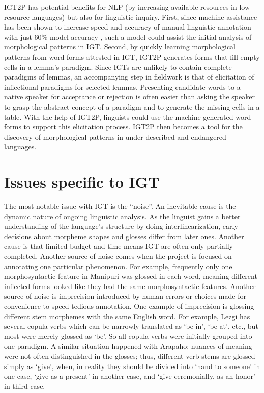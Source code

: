 IGT2P has potential benefits for NLP (by increasing available resources in low-resource languages) but also for linguistic inquiry. First, since machine-assistance has been shown to increase speed and accuracy of manual linguistic annotation with just 60\% model accuracy \citep{felt_improving_2012}, such a model could assist the initial analysis of morphological patterns in IGT. Second, by quickly learning morphological patterns from word forms attested in IGT, IGT2P generates forms that fill empty cells in a lemma's paradigm. Since IGTs are unlikely to contain complete paradigms of lemmas, an accompanying step in fieldwork is that of elicitation of inflectional paradigms for selected lemmas. Presenting candidate words to a native speaker for acceptance or rejection is often easier than asking the speaker to grasp the abstract concept of a paradigm and to generate the missing cells in a table. With the help of IGT2P, linguists could use the machine-generated word forms to support this elicitation process. IGT2P then becomes a tool for the discovery of morphological patterns in under-described and endangered languages.



\section{Issues specific to IGT}
\label{sec:issues}

The most notable issue with IGT is the ``noise''. An inevitable cause is the dynamic nature of ongoing linguistic analysis. As the linguist gains a better understanding of the language's structure by doing interlinearization, early decisions about morpheme shapes and glosses differ from later ones. Another cause is that limited budget and time means IGT are often only partially completed. Another source of noise comes when the project is focused on annotating one particular phenomenon. For example, frequently only one morphosyntactic feature in Manipuri was glossed in each word, meaning different inflected forms looked like they had the same morphosyntactic features. Another source of noise is imprecision introduced by human errors or choices made for convenience to speed tedious annotation. One example of imprecision is glossing different stem morphemes with the same English word. For example, Lezgi has several copula verbs which can be narrowly translated as `be in', `be at', etc., but most were merely glossed as `be'. So all copula verbs were initially grouped into one paradigm. A similar situation happened with Arapaho: nuances of meaning were not often distinguished in the glosses; thus, different verb stems are glossed simply as ‘give’, when, in reality they should be divided into ‘hand to someone’ in one case, ‘give as a present’ in another case, and ‘give ceremonially, as an honor’ in third case.


